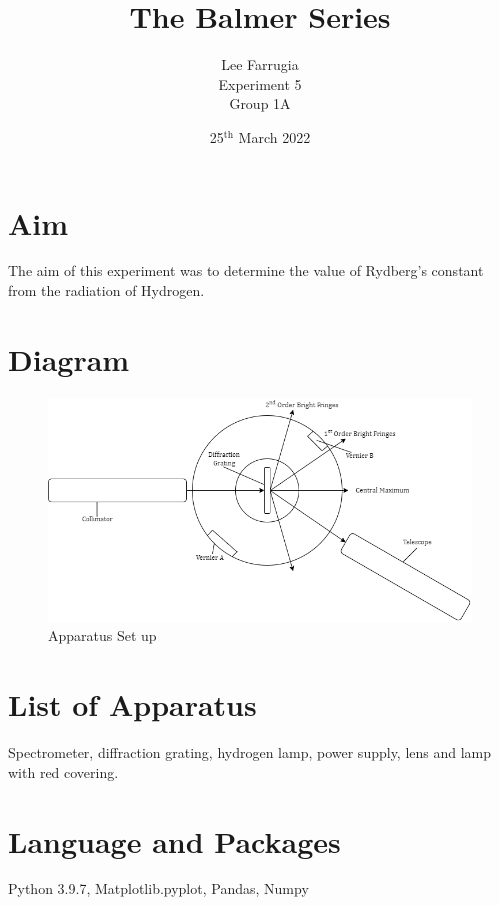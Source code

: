 \documentclass[12pt, a4paper]{article}
\title{The Balmer Series}
\author{Lee Farrugia \\ Experiment 5 \\ Group 1A}
\date{25$^{\text{th}}$ March 2022}
\begin{document}
\maketitle
\thispagestyle{titlepagestyle}
\pagestyle{mystyle}

\section*{Aim}
The aim of this experiment was to determine the value of Rydberg's constant from the radiation of Hydrogen.

\section*{Diagram}
\begin{figure}[H]
    \centering
    \includegraphics[width = \textwidth]{Experiment 5.png}
    \caption{Apparatus Set up}
    \label{fig:set up}
\end{figure}

\section*{List of Apparatus}
Spectrometer, diffraction grating, hydrogen lamp, power supply, lens and lamp with red covering.

\section*{Language and Packages}
Python 3.9.7, Matplotlib.pyplot, Pandas, Numpy
\end{document}
